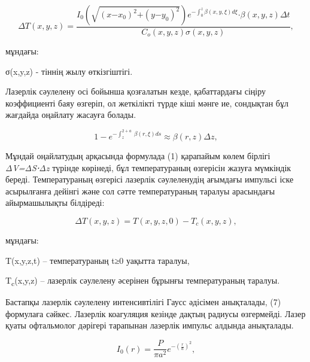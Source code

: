 \begin{equation}
\Delta T(x,y,z) = \frac{I_{0}\left( \sqrt{\left( x\mathbf{-}x_{0} \right)^{2}\mathbf{+}\left( y\mathbf{-}y_{0} \right)^{2}} \right)e^{- \int_{0}^{z}{\beta(x,y,\xi)d\xi}}\mathbf{\cdot}\beta(x,y,z)\Delta t}{C_{o}(x,y,z)\sigma(x,y,z)},
\end{equation}

\begin{multicols}{2}
мұндағы:

σ(x,y,z) - тіннің жылу өткізгіштігі.

Лазерлік сәулелену осі бойынша қозғалатын кезде, қабаттардағы сіңіру
коэффициенті баяу өзгеріп, ол жеткілікті түрде кіші мәнге ие, сондықтан
бұл жағдайда оңайлату жасауға болады.
\end{multicols}

\begin{equation}
1 - e^{- \int_{z}^{2 + a}\mspace{2mu}\mspace{2mu}\beta(r,\xi)ds} \approx \beta(r,z)\Delta z,
\end{equation}

\begin{multicols}{2}
Мұндай оңайлатудың арқасында формулада (1) қарапайым көлем бірлігі
\emph{ΔV=ΔS⋅Δz} түрінде көрінеді, бұл температураның өзгерісін жазуға
мүмкіндік береді. Температураның өзгерісі лазерлік сәулеленудің ағымдағы
импульсі іске асырылғанға дейінгі және сол сәтте температураның таралуы
арасындағы айырмашылықты білдіреді:
\end{multicols}

\begin{equation}
\Delta T(x,y,z) = T(x,y,z,0) - T_{c}(x,y,z),
\end{equation}

\begin{multicols}{2}
мұндағы:

T(x,y,z,t) -- температураның t≥0 уақытта таралуы,

T\textsubscript{c}(x,y,z) -- лазерлік сәулелену әсерінен бұрынғы
температураның таралуы.

Бастапқы лазерлік сәулелену интенсивтілігі Гаусс әдісімен анықталады,
(7) формулаға сәйкес. Лазерлік коагуляция кезінде дақтың радиусы
өзгермейді. Лазер қуаты офтальмолог дәрігері тарапынан лазерлік импульс
алдында анықталады.
\end{multicols}

\begin{equation}
I_{0}(r) = \frac{P}{\pi a^{2}}e^{- \left( \frac{r}{a} \right)^{2}},
\end{equation}

